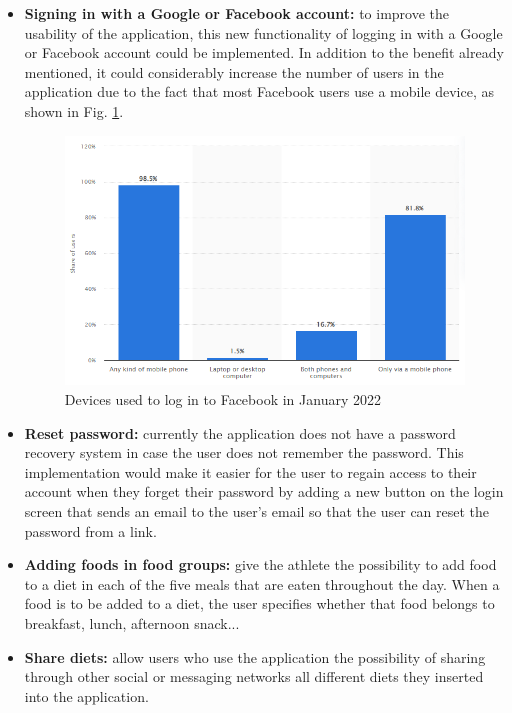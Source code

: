 \begin{itemize}
    \item \textbf{Signing in with a Google or Facebook account:} to improve the usability of the application, this new functionality of logging in with a Google or Facebook account could be implemented. In addition to the benefit already mentioned, it could considerably increase the number of users in the application due to the fact that most Facebook users use a mobile device, as shown in Fig. \ref{fig:fb_users}.
    \begin{figure}[H]
        \centering
        \includegraphics[width=\textwidth]{Images/Capitulo9/fbUsers.png}
        \caption{Devices used to log in to Facebook in January 2022 \cite{mobile_max_users}}
        \label{fig:fb_users}
    \end{figure}
    
    \item \textbf{Reset password:} currently the application does not have a password recovery system in case the user does not remember the password. This implementation would make it easier for the user to regain access to their account when they forget their password by adding a new button on the login screen that sends an email to the user's email so that the user can reset the password from a link.
    
    \item \textbf{Adding foods in food groups:} give the athlete the possibility to add food to a diet in each of the five meals that are eaten throughout the day. When a food is to be added to a diet, the user specifies whether that food belongs to breakfast, lunch, afternoon snack...
    
    \item \textbf{Share diets:} allow users who use the application the possibility of sharing through other social or messaging networks all different diets they inserted into the application.
    

\end{itemize}
